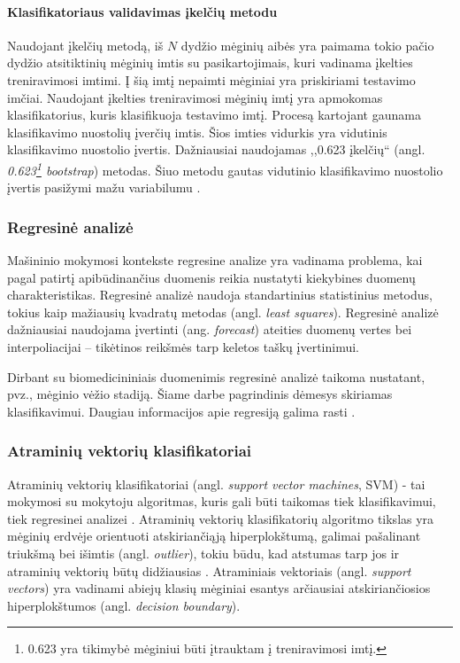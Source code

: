 \paragraph{Klasifikatoriaus validavimas įkelčių metodu}

Naudojant įkelčių metodą, iš $N$ dydžio mėginių aibės yra paimama tokio pačio dydžio atsitiktinių mėginių imtis su pasikartojimais, kuri vadinama įkelties treniravimosi imtimi. Į šią imtį nepaimti mėginiai yra priskiriami testavimo imčiai. Naudojant įkelties treniravimosi mėginių imtį yra apmokomas klasifikatorius, kuris klasifikuoja testavimo imtį. Procesą kartojant gaunama klasifikavimo nuostolių įverčių imtis. Šios imties vidurkis yra vidutinis klasifikavimo nuostolio įvertis. Dažniausiai naudojamas ,,0.623 įkelčių`` (angl. \textit{0.623\footnote{0.623 yra tikimybė mėginiui būti įtrauktam į treniravimosi imtį.} bootstrap}) metodas. Šiuo metodu gautas vidutinio klasifikavimo nuostolio įvertis pasižymi mažu variabilumu \cite{michie1994machine}.

\subsubsection{Regresinė analizė}

Mašininio mokymosi kontekste regresine analize yra vadinama problema, kai pagal patirtį apibūdinančius duomenis reikia nustatyti kiekybines duomenų charakteristikas. Regresinė analizė naudoja standartinius statistinius metodus, tokius kaip mažiausių kvadratų metodas (angl. \textit{least squares}). Regresinė analizė dažniausiai naudojama įvertinti (ang. \textit{forecast}) ateities duomenų vertes bei interpoliacijai -- tikėtinos reikšmės tarp keletos taškų įvertinimui. 

Dirbant su biomedicininiais duomenimis regresinė analizė taikoma nustatant, pvz., mėginio vėžio stadiją. Šiame darbe pagrindinis dėmesys skiriamas klasifikavimui. Daugiau informacijos apie regresiją galima rasti \cite{gelman2007data}.

\subsubsection{Atraminių vektorių klasifikatoriai}

Atraminių vektorių klasifikatoriai (angl. \textit{support vector machines}, SVM) - tai mokymosi su mokytoju algoritmas, kuris gali būti taikomas tiek klasifikavimui, tiek regresinei analizei \cite{vapnik2000nature}. Atraminių vektorių klasifikatorių algoritmo tikslas yra mėginių erdvėje orientuoti atskiriančiąją hiperplokštumą, galimai pašalinant triukšmą bei išimtis (angl. \textit{outlier}), tokiu būdu, kad atstumas tarp jos ir atraminių vektorių būtų didžiausias \cite{cortes1995support}. Atraminiais vektoriais (angl. \textit{support vectors}) yra vadinami abiejų klasių mėginiai esantys arčiausiai atskiriančiosios hiperplokštumos (angl. \textit{decision boundary}).

